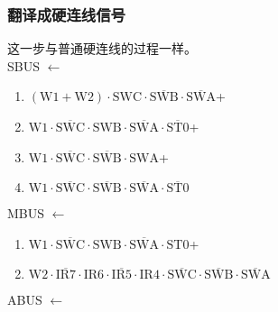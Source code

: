 \documentclass[UTF8]{ctexart}
\begin{document}
\subsubsection{翻译成硬连线信号}
这一步与普通硬连线的过程一样。\\
\noindent SBUS $\leftarrow$
\begin{enumerate}[\indent\indent]
	\item $(\text{W1} + \text{W2}) \cdot \text{SWC} \cdot \overline{\text{SWB}} \cdot \overline{\text{SWA}}$+
	\item $\text{W1} \cdot \overline{\text{SWC}} \cdot \text{SWB} \cdot \overline{\text{SWA}} \cdot \overline {\text{ST0}}$+
	\item $\text{W1} \cdot \overline{\text{SWC}} \cdot\overline{\text{SWB}}\cdot  \text{SWA}$+
​	\item $\text{W1} \cdot \overline{\text{SWC}} \cdot\overline{\text{SWB}}\cdot \overline{\text{SWA}}\cdot \overline{\text{ST0}} $
\end{enumerate}
\noindent MBUS $\leftarrow$
\begin{enumerate}[\indent\indent]
	\item $\text{W1} \cdot \overline{\text{SWC}} \cdot \text{SWB} \cdot \overline{\text{SWA}} \cdot \text{ST0}$+
	\item $\text{W2} \cdot \overline{\text{IR7}} \cdot \text{IR6} \cdot \overline{\text{IR5}} \cdot \text{IR4} \cdot \overline{\text{SWC}} \cdot\overline{\text{SWB}}\cdot \overline{\text{SWA}}$
\end{enumerate}
\noindent ABUS $\leftarrow$
\end{document}
